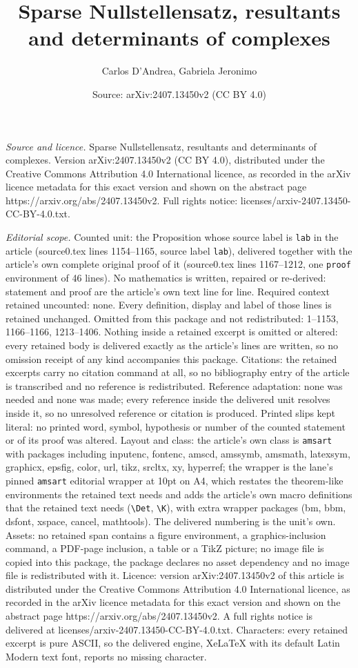 \documentclass[10pt,a4paper]{amsart}
\title[Sparse Nullstellensatz, resultants and determinants of compl]{Sparse Nullstellensatz, resultants and determinants of complexes}
\author{Carlos D'Andrea, Gabriela Jeronimo}
\date{Source: arXiv:2407.13450v2 (CC BY 4.0)}
\begin{document}
\maketitle

\noindent\emph{Source and licence.} Sparse Nullstellensatz, resultants and determinants of complexes. Version arXiv:2407.13450v2 (CC BY 4.0), distributed under the Creative Commons Attribution 4.0 International licence, as recorded in the arXiv licence metadata for this exact version and shown on the abstract page https://arxiv.org/abs/2407.13450v2. Full rights notice: licenses/arxiv-2407.13450-CC-BY-4.0.txt.\par\smallskip

\noindent\textit{Editorial scope.} Counted unit: the Proposition whose source label is \texttt{lab} in the article (source0.tex lines 1154--1165, source label \texttt{lab}), delivered together with the article's own complete original proof of it (source0.tex lines 1167--1212, one \texttt{proof} environment of 46 lines). No mathematics is written, repaired or re-derived: statement and proof are the article's own text line for line. Required context retained uncounted: none. Every definition, display and label of those lines is retained unchanged. Omitted from this package and not redistributed: 1--1153, 1166--1166, 1213--1406. Nothing inside a retained excerpt is omitted or altered: every retained body is delivered exactly as the article's lines are written, so no omission receipt of any kind accompanies this package. Citations: the retained excerpts carry no citation command at all, so no bibliography entry of the article is transcribed and no reference is redistributed. Reference adaptation: none was needed and none was made; every reference inside the delivered unit resolves inside it, so no unresolved reference or citation is produced. Printed slips kept literal: no printed word, symbol, hypothesis or number of the counted statement or of its proof was altered. Layout and class: the article's own class is \texttt{amsart} with packages including inputenc, fontenc, amscd, amssymb, amsmath, latexsym, graphicx, epsfig, color, url, tikz, srcltx, xy, hyperref; the wrapper is the lane's pinned \texttt{amsart} editorial wrapper at 10pt on A4, which restates the theorem-like environments the retained text needs and adds the article's own macro definitions that the retained text needs (\texttt{\textbackslash Det}, \texttt{\textbackslash K}), with extra wrapper packages (bm, bbm, dsfont, xspace, cancel, mathtools). The delivered numbering is the unit's own. Assets: no retained span contains a figure environment, a graphics-inclusion command, a PDF-page inclusion, a table or a TikZ picture; no image file is copied into this package, the package declares no asset dependency and no image file is redistributed with it. Licence: version arXiv:2407.13450v2 of this article is distributed under the Creative Commons Attribution 4.0 International licence, as recorded in the arXiv licence metadata for this exact version and shown on the abstract page https://arxiv.org/abs/2407.13450v2. A full rights notice is delivered at licenses/arxiv-2407.13450-CC-BY-4.0.txt. Characters: every retained excerpt is pure ASCII, so the delivered engine, XeLaTeX with its default Latin Modern text font, reports no missing character.
\end{document}
